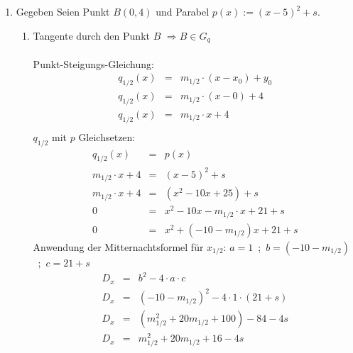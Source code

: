\documentclass{scrartcl}
\begin{document}
		
	\begin{enumerate}
		
		
		\item Gegeben Seien Punkt $B(0,4)$ und Parabel $p(x):=(x-5)^2+s$.
		\begin{enumerate}
			\item Tangente durch den Punkt $B$ $\Rightarrow B \in G_q$ \label{Tangentengleichung_bestimmen} \\
				\\ Punkt-Steigungs-Gleichung:
				\begin{eqnarray}
					q_{1/2}(x) &=& m_{1/2} \cdot (x-x_0)+y_0 \\
					q_{1/2}(x) &=& m_{1/2} \cdot (x-0)+4 \\
					q_{1/2}(x) &=& m_{1/2} \cdot x+4 \\
				\end{eqnarray}
				$q_{1/2}$ mit $p$ Gleichsetzen:
				\begin{eqnarray}
					q_{1/2}(x) &=& p(x)\\
					m_{1/2} \cdot x+4 &=& (x-5)^2+s \\
					m_{1/2} \cdot x+4 &=& (x^2-10x +25)+s\\
					0 &=& x^2-10x-m_{1/2}\cdot x+21+s\\
					0 &=& x^2+(-10-m_{1/2})x+21+s \label{Ende_Normalform_x}
				\end{eqnarray}
				Anwendung der Mitternachtsformel für $x_{1/2}$: $a=1$\ ;\ $b=(-10-m_{1/2})$\ ;\ $c= 21+s$
				\begin{eqnarray}
					D_x &=& b^2-4 \cdot a \cdot c \\
					D_x &=& (-10-m_{1/2})^2 -4 \cdot 1 \cdot (21+s)\\
					D_x &=& (m_{1/2}^2+20m_{1/2}+100) -84-4s\\
					D_x &=& m_{1/2}^2+20m_{1/2}+16-4s \label{Ende_D_x}
				\end{eqnarray}
				
				
				

\end{enumerate}
\end{enumerate}
\end{document}
